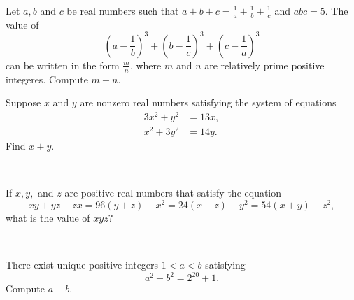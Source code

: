 \documentclass{article}
\begin{document}
\begin{prob}[BMT 2020]{6}
Let $a,b$ and $c$ be real numbers such that $a+b+c=\frac{1}{a}+\frac{1}{b}+\frac{1}{c}$ and $abc=5$. The value of
$$(a-\frac{1}{b})^3+(b-\frac{1}{c})^3+(c-\frac{1}{a})^3$$
can be written in the form $\frac{m}{n}$, where $m$ and $n$ are relatively prime positive integeres. Compute $m+n$.
\end{prob}

\begin{prob}{6}
Suppose $x$ and $y$ are nonzero real numbers satisfying the system of equations
\begin{align*}
    3x^2 + y^2 &= 13x,\\
    x^2 + 3y^2 &= 14y.
\end{align*}
Find $x+y$.
\end{prob}
\\


\begin{req}[JMC 10 2021/18]{9}
If $x,y,$ and $z$ are positive real numbers that satisfy the equation
\[xy+yz+zx=96(y+z)-x^2 = 24(x+z) -y^2 = 54(x+y) -z^2,\]
what is the value of $xyz$?
\end{req}
\\

\begin{prob}[CARML 2019/8]{13}
There exist unique positive integers $1<a<b$ satisfying
\[a^2+b^2=2^{20}+1.\]
Compute $a+b$.
\end{prob}
\end{document}
